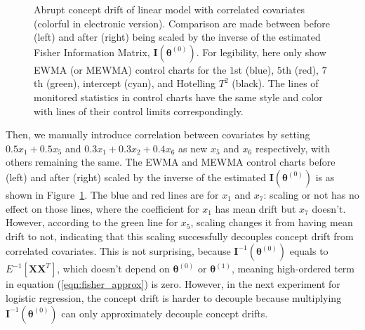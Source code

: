 \documentclass[twoside,11pt]{article}
\begin{document}
\begin{enumerate}[(I)]
\begin{figure}[!htbp]
  \caption{Abrupt concept drift of linear model with correlated {covariates} (colorful in electronic version). Comparison are made between before (left) and after (right) being scaled by {the inverse of the estimated} Fisher Information Matrix, {$\mathbf {I} ( {\bm{\theta}} ^{(0)})$.} For legibility, here only show EWMA (or MEWMA) control charts for the $1$st (blue), $5$th (red), $7$th (green), intercept (cyan), and Hotelling $T^2$ (black). The lines of monitored statistics in control charts have the same style and color with lines of their control limits correspondingly.}
  \label{fig:lin_reg_not_ind_X}
\end{figure}
Then, we manually introduce correlation between {covariates} by setting $0.5 x_1 + 0.5 x_5$ and $ 0.3 x_1 + 0.3 x_2 + 0.4 x_6$ as new $x_5$ and $x_6$ respectively, with others remaining the same. The EWMA and MEWMA control charts before (left) and after (right) scaled by {the inverse of the estimated} ${\mathbf {I}}(\bm { \theta}^{(0)})$ is as shown in Figure~\ref{fig:lin_reg_not_ind_X}. The blue and red lines are for $x_1$ and $x_7$: scaling or not has no effect on those lines, where the coefficient for $x_1$ has mean {drift} but $x_7$ doesn't. However, according to the green line for $x_5$, scaling changes it from having mean {drift} to not, indicating that this scaling successfully decouples concept drift from correlated covariates. This is not surprising, because ${\mathbf {I}} ^{-1}(\bm { \theta}^{(0)})$ equals to $E ^{-1} [\bm {X}\bm {X}^T]$, which doesn't depend on $ \bm { \theta} ^{(0)}$ or $ \bm { \theta} ^{(1)}$, meaning high-ordered term in equation (\ref{eqn:fisher_approx}) is zero. However, in the next experiment for logistic regression, the concept drift is harder to decouple because multiplying ${\mathbf {I}} ^{-1}(\bm { \theta}^{(0)})$ can only approximately decouple concept drifts.


\end{enumerate}
\end{document}
